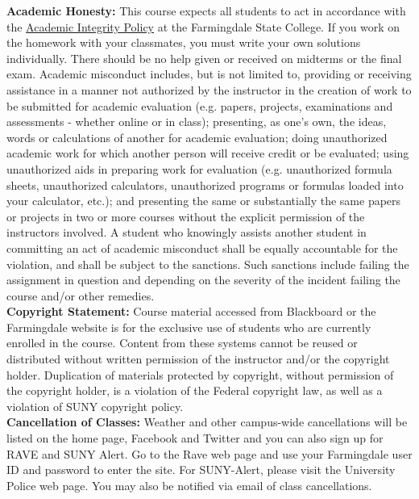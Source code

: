 \documentclass[11pt]{article}
\begin{document}
{\bf Academic Honesty:} This course expects all students to act in accordance with the \href{https://www.farmingdale.edu/administration/provost/pdf/academic-integrity.pdf}{Academic Integrity Policy} at the Farmingdale State College.  If you work on the homework with your classmates, you must write your own solutions individually. There should be no help given or received on midterms or the final exam. Academic misconduct includes, but is not limited to, providing or receiving assistance in a manner not authorized by the instructor in the creation of work to be submitted for academic evaluation (e.g. papers, projects, examinations and assessments - whether online or in class); presenting, as one's own, the ideas, words or calculations of another for academic evaluation; doing unauthorized academic work for which another person will receive credit or be evaluated; using unauthorized aids in preparing work for evaluation (e.g. unauthorized formula sheets, unauthorized calculators, unauthorized programs or formulas loaded into your calculator, etc.); and presenting the same or substantially the same papers or projects in two or more courses without the explicit permission of the instructors involved. A student who knowingly assists another student in committing an act of academic misconduct shall be equally accountable for the violation, and shall be subject to the sanctions. Such sanctions include failing the assignment in question and depending on the severity of the incident failing the course and/or other remedies. \\

{\bf Copyright Statement:} Course material accessed from Blackboard or the Farmingdale website is for the exclusive use of students who are currently enrolled in the course. Content from these systems cannot be reused or distributed without written permission of the instructor and/or the copyright holder. Duplication of materials protected by copyright, without permission of the copyright holder, is a violation of the Federal copyright law, as well as a violation of SUNY copyright policy.\\

{\bf Cancellation of Classes:} Weather and other campus-wide cancellations will be listed on the home page, Facebook and Twitter and you can also sign up for RAVE and SUNY Alert. Go to the Rave web page and use your Farmingdale user ID and password to enter the site. For SUNY-Alert, please visit the University Police web page. You may also be notified via email of class cancellations.\\
\end{document}
